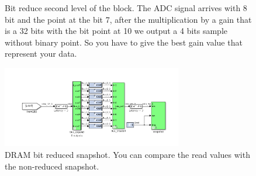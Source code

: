 \begin{enumerate}
\begin{figure}
        \caption{Bit reduce second level of the block. The ADC signal arrives with 8 bit and the point at the bit 7, after the multiplication by a gain that is a 32 bits with the bit point at 10 we output a 4 bits sample without binary point. So you have to give the best gain value that represent your data.}
        \label{fig:gain_block2}
    \end{figure}


    \begin{figure}
        \centering
        \includegraphics[width=0.7\textwidth]{images/dram_snapshot.png}
        \caption{DRAM bit reduced snapshot. You can compare the read values with the non-reduced snapshot.}
        \label{fig:reduced_snapshot}
    \end{figure}



\end{enumerate}

